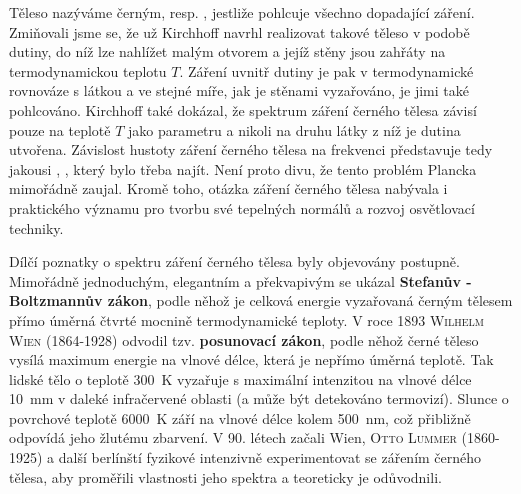         Těleso nazýváme černým, resp. \emph{}, jestliže pohlcuje všechno
        dopadající záření. Zmiňovali jsme se, že už Kirchhoff navrhl realizovat takové těleso v
        podobě dutiny, do níž lze nahlížet malým otvorem a jejíž stěny jsou zahřáty na
        termodynamickou teplotu \(T\). Záření uvnitř dutiny je pak v termodynamické rovnováze s
        látkou a ve stejné míře, jak je stěnami vyzařováno, je jimi také pohlcováno. Kirchhoff také
        dokázal, že spektrum záření černého tělesa závisí pouze na teplotě \(T\) jako parametru a
        nikoli na druhu látky z níž je dutina utvořena. Závislost hustoty záření černého tělesa na
        frekvenci představuje tedy jakousi \emph{}, \emph{}, který bylo třeba najít. Není proto divu, že tento problém Plancka mimořádně zaujal.
        Kromě toho, otázka záření černého tělesa nabývala i praktického významu pro tvorbu své
        tepelných normálů a rozvoj osvětlovací techniky.


        Dílčí poznatky o spektru záření černého tělesa byly objevovány postupně. Mimořádně
        jednoduchým, elegantním a překvapivým se ukázal \textbf{Stefanův -Boltzmannův zákon}, podle
        něhož je celková energie vyzařovaná černým tělesem přímo úměrná čtvrté mocnině
        termodynamické teploty. V roce 1893 \textsc{Wilhelm Wien} (1864-1928) odvodil tzv.
        \textbf{posunovací zákon}, podle něhož černé těleso vysílá maximum energie na vlnové délce,
        která je nepřímo úměrná teplotě. Tak lidské tělo o teplotě \SI{300}{\K} vyzařuje s maximální
        intenzitou na vlnové délce \SI{10}{\mm} v daleké infračervené oblasti (a může být detekováno
        termovizí). Slunce o povrchové teplotě \SI{6000}{\K} září na vlnové délce kolem
        \SI{500}{\nm}, což přibližně odpovídá jeho žlutému zbarvení. V 90. létech začali Wien,
        \textsc{Otto Lummer} (1860-1925) a další berlínští fyzikové intenzivně experimentovat se
        zářením černého tělesa, aby proměřili vlastnosti jeho spektra a teoreticky je odůvodnili.

